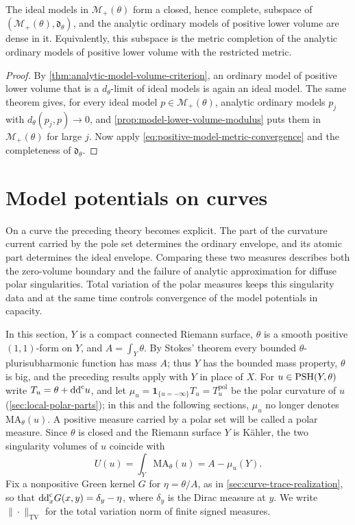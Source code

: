 \begin{corollary}\label{cor:positive-ideal-metric-completion}
The ideal models in $\mathcal M_+(\theta)$ form a closed, hence complete, subspace of $(\mathcal M_+(\theta),\mathfrak d_\theta)$, and the analytic ordinary models of positive lower volume are dense in it. Equivalently, this subspace is the metric completion of the analytic ordinary models of positive lower volume with the restricted metric.
\end{corollary}
\begin{proof}
By \cref{thm:analytic-model-volume-criterion}, an ordinary model of positive lower volume that is a $d_\theta$-limit of ideal models is again an ideal model. The same theorem gives, for every ideal model $p\in\mathcal M_+(\theta)$, analytic ordinary models $p_j$ with $d_\theta(p_j,p)\to0$, and \cref{prop:model-lower-volume-modulus} puts them in $\mathcal M_+(\theta)$ for large $j$. Now apply \eqref{eq:positive-model-metric-convergence} and the completeness of $\mathfrak d_\theta$.
\end{proof}

\section{Model potentials on curves}
\label{sec:curve-zero-volume-models}

On a curve the preceding theory becomes explicit. The part of the curvature current carried by the pole set determines the ordinary envelope, and its atomic part determines the ideal envelope. Comparing these two measures describes both the zero-volume boundary and the failure of analytic approximation for diffuse polar singularities. Total variation of the polar measures keeps this singularity data and at the same time controls convergence of the model potentials in capacity.

In this section, $Y$ is a compact connected Riemann surface, $\theta$ is a smooth positive $(1,1)$-form on $Y$, and $A=\int_Y\theta$. By Stokes' theorem every bounded $\theta$-plurisubharmonic function has mass $A$; thus $Y$ has the bounded mass property, $\theta$ is big, and the preceding results apply with $Y$ in place of $X$. For $u\in\mathrm{PSH}(Y,\theta)$ write $T_u=\theta+\mathrm{dd}^{\mathrm{c}} u$, and let $\mu_u=\mathbf1_{\{u=-\infty\}}T_u=T_u^{\mathrm{pol}}$ be the polar curvature of $u$ (\cref{sec:local-polar-parts}); in this and the following sections, $\mu_u$ no longer denotes $\mathrm{MA}_\theta(u)$. A positive measure carried by a polar set will be called a polar measure. Since $\theta$ is closed and the Riemann surface $Y$ is K\"ahler, the two singularity volumes of $u$ coincide with
\[
 U(u)=\int_Y\mathrm{MA}_\theta(u)=A-\mu_u(Y).
\]
Fix a nonpositive Green kernel $G$ for $\eta=\theta/A$, as in \cref{sec:curve-trace-realization}, so that $\mathrm{dd}^{\mathrm{c}}_xG(x,y)=\delta_y-\eta$, where $\delta_y$ is the Dirac measure at $y$. We write $\|\cdot\|_{\mathrm{TV}}$ for the total variation norm of finite signed measures.

